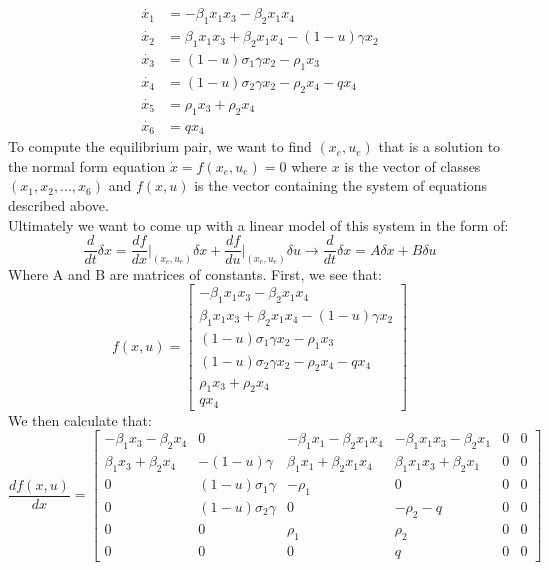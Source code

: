 \documentclass[letterpaper,twocolumn,10pt]{article}
\begin{document}
\begin{equation*}
\begin{split}
\dot{x_{1}} &= -\beta_{1}x_{1}x_{3} - \beta_{2}x_{1}x_{4}\\
\dot{x_{2}} &= \beta_{1}x_{1}x_{3} + \beta_{2}x_{1}x_{4} - (1-u)\gamma x_{2}\\
\dot{x_{3}} &= (1-u)\sigma_{1}\gamma x_{2} - \rho_{1}x_{3}\\
\dot{x_{4}} &= (1-u)\sigma_{2}\gamma x_{2} - \rho_{2}x_{4} - qx_{4}\\
\dot{x_{5}} &= \rho_{1}x_{3} + \rho_{2}x_{4}\\
\dot{x_{6}} &= qx_{4}
\end{split}
\end{equation*}
To compute the equilibrium pair, we want to find \((x_{e}, u_{e})\) that is a solution to the normal form equation \(\dot{x} = f(x_{e}, u_{e}) = 0\) where \(x\) is the vector of classes \((x_{1}, x_{2}, ..., x_{6})\) and \(f(x, u)\) is the vector containing the system of equations described above.\\
Ultimately we want to come up with a linear model of this system in the form of: \[\frac{d}{dt}\delta x = \frac{df}{dx}\bigg|_{(x_{e}, u_{e})}\delta x + \frac{df}{du}\bigg|_{(x_{e}, u_{e})}\delta u \rightarrow \frac{d}{dt}\delta x = A\delta x + B\delta u\]
Where A and B are matrices of constants. \hspace*{\fill}
\vspace{2mm}
\linebreak
First, we see that:
\begin{equation*}
f(x, u)
=
\begin{bmatrix}
-\beta_{1}x_{1}x_{3} - \beta_{2}x_{1}x_{4}\\
\beta_{1}x_{1}x_{3} + \beta_{2}x_{1}x_{4} - (1-u)\gamma x_{2}\\
(1-u)\sigma_{1}\gamma x_{2} - \rho_{1}x_{3}\\
(1-u)\sigma_{2}\gamma x_{2} - \rho_{2}x_{4} - qx_{4}\\
\rho_{1}x_{3} + \rho_{2}x_{4}\\
qx_{4}
\end{bmatrix}
\end{equation*}
We then calculate that:
\begin{equation*}
\frac{df(x, u)}{dx}
=
\begin{bmatrix}
-\beta_{1}x_{3} - \beta_{2}x_{4} & 0 & -\beta_{1}x_{1} - \beta_{2}x_{1}x_{4}  & -\beta_{1}x_{1}x_{3} - \beta_{2}x_{1} & 0 & 0\\
\beta_{1}x_{3} + \beta_{2}x_{4} & -(1-u)\gamma & \beta_{1}x_{1} + \beta_{2}x_{1}x_{4} & \beta_{1}x_{1}x_{3} + \beta_{2}x_{1} & 0 & 0\\
0 & (1-u)\sigma_{1}\gamma & -\rho_{1} & 0 & 0 & 0\\
0 & (1-u)\sigma_{2}\gamma & 0 & -\rho_{2}-q & 0 & 0\\
0 & 0 & \rho_{1} & \rho_{2} & 0 & 0\\
0 & 0 & 0 & q & 0 & 0
\end{bmatrix}
\end{equation*}
\vspace{28mm}
\end{document}

